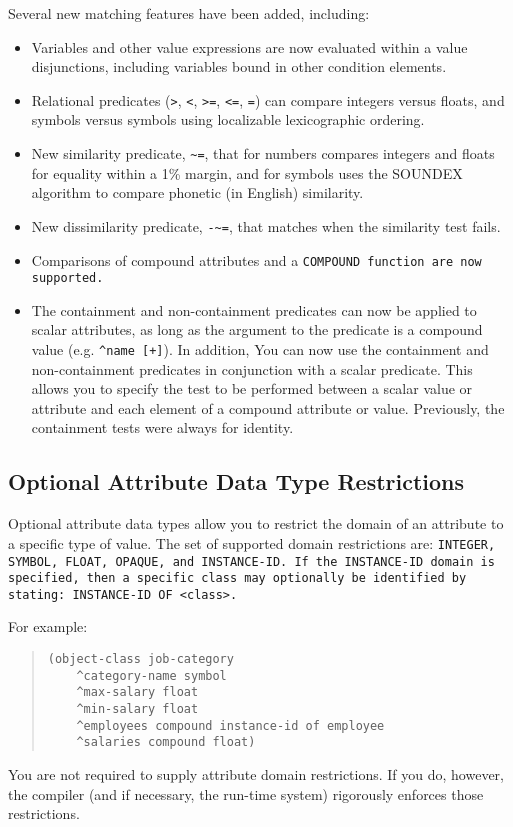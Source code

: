Several new matching features have been added, including:
\begin{itemize}
\item Variables and other value expressions are now evaluated within a
  value disjunctions, including variables bound in other condition
  elements.

\item Relational predicates (\verb|>|, \verb|<|, \verb|>=|, \verb|<=|,
  \verb|=|) can compare integers versus floats, and symbols versus
  symbols using localizable lexicographic ordering.

\item New similarity predicate, \verb|~=|, that for numbers compares
  integers and floats for equality within a 1\% margin, and for
  symbols uses the SOUNDEX algorithm to compare phonetic (in English)
  similarity.

\item New dissimilarity predicate, \verb|-~=|, that matches when the
  similarity test fails.

\item Comparisons of compound attributes and a \tt{COMPOUND} function
  are now supported.

\item The containment and non-containment predicates can now be
  applied to scalar attributes, as long as the argument to the
  predicate is a compound value (e.g.  \verb|^name [+]|). In addition,
  You can now use the containment and non-containment predicates in
  conjunction with a scalar predicate. This allows you to specify the
  test to be performed between a scalar value or attribute and each
  element of a compound attribute or value. Previously, the
  containment tests were always for identity.
\end{itemize}
      
\subsection{Optional Attribute Data Type Restrictions}

Optional attribute data types allow you to restrict the domain of an
attribute to a specific type of value. The set of supported domain
restrictions are: \tt{INTEGER}, \tt{SYMBOL}, \tt{FLOAT}, \tt{OPAQUE},
and \tt{INSTANCE-ID}. If the \tt{INSTANCE-ID} domain is specified,
then a specific class may optionally be identified by stating:
\tt{INSTANCE-ID OF}
 \verb|<class>|.

For example:
\begin{quote}
\begin{verbatim}
(object-class job-category
    ^category-name symbol
    ^max-salary float
    ^min-salary float
    ^employees compound instance-id of employee
    ^salaries compound float)
\end{verbatim}
\end{quote}
You are not required to supply attribute domain restrictions. If you
do, however, the compiler (and if necessary, the run-time system)
rigorously enforces those restrictions.

